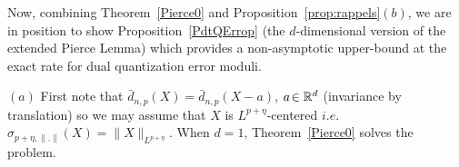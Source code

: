 % 
% 
% 
Now, combining Theorem~\ref{Pierce0} and Proposition~\ref{prop:rappels}$(b)$, we are in position to show Proposition~\ref{PdtQErrop} (the
$d$-dimensional version of the extended Pierce Lemma)  which provides a non-asymptotic upper-bound at the exact rate for dual quantization error moduli.

% 
 
\medskip
{} $(a)$ First note that $ \bar d_{n,p}(X)= \bar d_{n,p}(X-a)$, $a\!\in \mathbb{R}^d$ (invariance by translation)    so we may assume that $X$  is $L^{p+\eta}$-centered $i.e.$ $\sigma_{p+\eta,\|.\|}(X)= \|X\|_{L^{p+\eta}}$. When $d=1$, Theorem~\ref{Pierce0} solves the problem.

